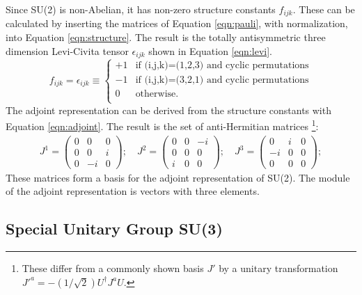 Since SU(2) is non-Abelian, it has non-zero structure constants $f_{ijk}$. 
These can be calculated by inserting the matrices of Equation \ref{eqn:pauli}, with normalization, into Equation \ref{eqn:structure}.
The result is the totally antisymmetric three dimension Levi-Civita tensor $\epsilon_{ijk}$ shown in Equation \ref{eqn:levi}.
\begin{equation}\label{eqn:levi}
f_{ijk} = \epsilon_{ijk} \equiv \begin{cases}
+1 &\text{if (i,j,k)=(1,2,3) and cyclic permutations}\\
-1 &\text{if (i,j,k)=(3,2,1) and cyclic permutations}\\
0 &\text{otherwise.}\\
\end{cases}
\end{equation} 
The adjoint representation can be derived from the structure constants with Equation \ref{eqn:adjoint}.
The result is the set of anti-Hermitian matrices \footnote{These differ from a commonly shown basis $J'$ by a unitary transformation $J'^a=-(1/\sqrt{2})U^\dagger J^aU$.}:
\begin{equation}\begin{split}
J^1 = \begin{pmatrix}0&0&0\\0&0&i\\0&-i&0\end{pmatrix} ; \quad
J^2 = \begin{pmatrix}0&0&-i\\0&0&0\\i&0&0\end{pmatrix} ; \quad
J^3 = \begin{pmatrix}0&i&0\\-i&0&0\\0&0&0\end{pmatrix} ;
\end{split}\end{equation}
These matrices form a basis for the adjoint representation of SU(2).
The module of the adjoint representation is vectors with three elements.

\subsection{Special Unitary Group SU(3)}


